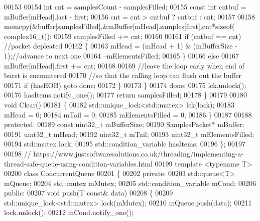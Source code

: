 \begin{DoxyCode}
00153 
00154                 \textcolor{keywordtype}{int} cnt = samplesCount - samplesFilled;
00155                 \textcolor{keyword}{const} \textcolor{keywordtype}{int} cntbuf = mBuffer[mHead].last - first;
00156                 cnt = cnt > cntbuf ? cntbuf : cnt;
00157 
00158                 memcpy(&buffer[samplesFilled],&mBuffer[mHead].samples[first],cnt*\textcolor{keyword}{sizeof}(
      complex16_t));
00159                 samplesFilled += cnt;
00160 
00161                 \textcolor{keywordflow}{if} (cntbuf == cnt) \textcolor{comment}{//packet depleated}
00162                 \{
00163                     mHead = (mHead + 1) & (mBufferSize - 1);\textcolor{comment}{//advance to next one}
00164                     --mElementsFilled;
00165                 \}
00166                 \textcolor{keywordflow}{else}
00167                     mBuffer[mHead].first += cnt;
00168 
00169                 \textcolor{comment}{//leave the loop early when end of burst is encountered}
00170                 \textcolor{comment}{//so that the calling loop can flush out the buffer}
00171                 \textcolor{keywordflow}{if} (hasEOB) \textcolor{keywordflow}{goto} done;
00172             \}
00173         \}
00174         done:
00175         lck.unlock();
00176         hasItems.notify\_one();
00177         \textcolor{keywordflow}{return} samplesFilled;
00178     \}
00179 
00180     \textcolor{keywordtype}{void} Clear()
00181     \{
00182         std::unique\_lock<std::mutex> lck(lock);
00183         mHead = 0;
00184         mTail = 0;
00185         mElementsFilled = 0;
00186     \}
00187 
00188 \textcolor{keyword}{protected}:
00189     \textcolor{keyword}{const} uint32\_t mBufferSize;
00190     SamplesPacket* mBuffer;
00191     uint32\_t mHead;
00192     uint32\_t mTail;
00193     uint32\_t mElementsFilled;
00194     std::mutex lock;
00195     std::condition\_variable hasItems;
00196 \};
00197 
00198 \textcolor{comment}{//
      https://www.justsoftwaresolutions.co.uk/threading/implementing-a-thread-safe-queue-using-condition-variables.html}
00199 \textcolor{keyword}{template} <\textcolor{keyword}{typename} T>
00200 \textcolor{keyword}{class }ConcurrentQueue
00201 \{
00202 \textcolor{keyword}{private}:
00203     std::queue<T> mQueue;
00204     std::mutex mMutex;
00205     std::condition\_variable mCond;
00206 \textcolor{keyword}{public}:
00207     \textcolor{keywordtype}{void} push(T \textcolor{keyword}{const}& data)
00208     \{
00209         std::unique\_lock<std::mutex> lock(mMutex);
00210         mQueue.push(data);
00211         lock.unlock();
00212         mCond.notify\_one();

\end{DoxyCode}
